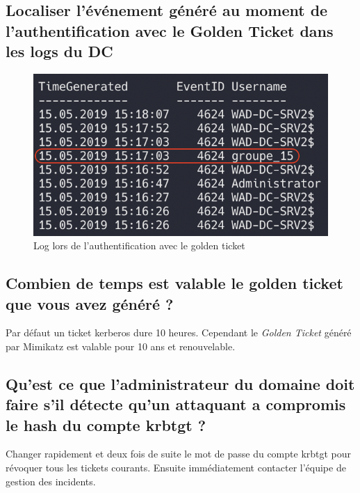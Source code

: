 \documentclass{extarticle} %
\begin{document}
    \subsection{Localiser l’événement généré au moment de l’authentification avec le Golden Ticket dans les logs du DC}

    \begin{figure}[H]
        \centering
        \includegraphics[scale=0.3]{images/gd_logs.png}
        \caption{Log lors de l'authentification avec le golden ticket}
    \end{figure}

    \subsection{Combien de temps est valable le golden ticket que vous avez généré ?}
    Par défaut un ticket kerberos dure 10 heures. Cependant le \textit{Golden Ticket} généré par Mimikatz est valable pour 10 ans et renouvelable.

    \subsection{Qu’est ce que l’administrateur du domaine doit faire s’il détecte qu’un attaquant a compromis le hash du compte krbtgt ?}
    Changer rapidement et deux fois de suite le mot de passe du compte krbtgt pour révoquer tous les tickets courants. Ensuite immédiatement
    contacter l'équipe de gestion des incidents.

    \pagebreak
\end{document}
